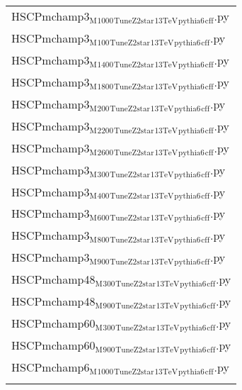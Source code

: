 \documentclass[11 pt , letterpaper , twoside , openright]{book}
\begin{document}
\begin{enumerate}
\begin{enumerate}
\begin{center}
\begin{tabular}{l}
HSCPmchamp3$_{\text{M}}$$_{\text{1000}}$$_{\text{TuneZ2star}}$$_{\text{13TeV}}$$_{\text{pythia6}}$$_{\text{cff}}$.py\\
HSCPmchamp3$_{\text{M}}$$_{\text{100}}$$_{\text{TuneZ2star}}$$_{\text{13TeV}}$$_{\text{pythia6}}$$_{\text{cff}}$.py\\
HSCPmchamp3$_{\text{M}}$$_{\text{1400}}$$_{\text{TuneZ2star}}$$_{\text{13TeV}}$$_{\text{pythia6}}$$_{\text{cff}}$.py\\
HSCPmchamp3$_{\text{M}}$$_{\text{1800}}$$_{\text{TuneZ2star}}$$_{\text{13TeV}}$$_{\text{pythia6}}$$_{\text{cff}}$.py\\
HSCPmchamp3$_{\text{M}}$$_{\text{200}}$$_{\text{TuneZ2star}}$$_{\text{13TeV}}$$_{\text{pythia6}}$$_{\text{cff}}$.py\\
HSCPmchamp3$_{\text{M}}$$_{\text{2200}}$$_{\text{TuneZ2star}}$$_{\text{13TeV}}$$_{\text{pythia6}}$$_{\text{cff}}$.py\\
HSCPmchamp3$_{\text{M}}$$_{\text{2600}}$$_{\text{TuneZ2star}}$$_{\text{13TeV}}$$_{\text{pythia6}}$$_{\text{cff}}$.py\\
HSCPmchamp3$_{\text{M}}$$_{\text{300}}$$_{\text{TuneZ2star}}$$_{\text{13TeV}}$$_{\text{pythia6}}$$_{\text{cff}}$.py\\
HSCPmchamp3$_{\text{M}}$$_{\text{400}}$$_{\text{TuneZ2star}}$$_{\text{13TeV}}$$_{\text{pythia6}}$$_{\text{cff}}$.py\\
HSCPmchamp3$_{\text{M}}$$_{\text{600}}$$_{\text{TuneZ2star}}$$_{\text{13TeV}}$$_{\text{pythia6}}$$_{\text{cff}}$.py\\
HSCPmchamp3$_{\text{M}}$$_{\text{800}}$$_{\text{TuneZ2star}}$$_{\text{13TeV}}$$_{\text{pythia6}}$$_{\text{cff}}$.py\\
HSCPmchamp3$_{\text{M}}$$_{\text{900}}$$_{\text{TuneZ2star}}$$_{\text{13TeV}}$$_{\text{pythia6}}$$_{\text{cff}}$.py\\
HSCPmchamp48$_{\text{M}}$$_{\text{300}}$$_{\text{TuneZ2star}}$$_{\text{13TeV}}$$_{\text{pythia6}}$$_{\text{cff}}$.py\\
HSCPmchamp48$_{\text{M}}$$_{\text{900}}$$_{\text{TuneZ2star}}$$_{\text{13TeV}}$$_{\text{pythia6}}$$_{\text{cff}}$.py\\
HSCPmchamp60$_{\text{M}}$$_{\text{300}}$$_{\text{TuneZ2star}}$$_{\text{13TeV}}$$_{\text{pythia6}}$$_{\text{cff}}$.py\\
HSCPmchamp60$_{\text{M}}$$_{\text{900}}$$_{\text{TuneZ2star}}$$_{\text{13TeV}}$$_{\text{pythia6}}$$_{\text{cff}}$.py\\
HSCPmchamp6$_{\text{M}}$$_{\text{1000}}$$_{\text{TuneZ2star}}$$_{\text{13TeV}}$$_{\text{pythia6}}$$_{\text{cff}}$.py\\
$$
\end{tabular}
\end{center}
\end{enumerate}
\end{enumerate}
\end{document}
